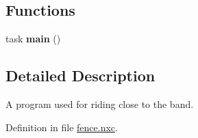 \subsection*{Functions}
\begin{DoxyCompactItemize}
\item 
\hypertarget{fence_8nxc_a9a2af8e2cd81255d3bf384db4a382807}{
task {\bfseries main} ()}
\label{fence_8nxc_a9a2af8e2cd81255d3bf384db4a382807}

\end{DoxyCompactItemize}


\subsection{Detailed Description}
A program used for riding close to the band. 

Definition in file \hyperlink{fence_8nxc_source}{fence.nxc}.

